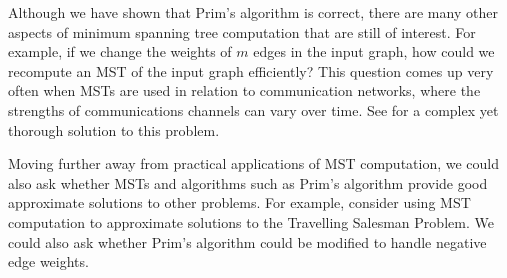 \documentclass[a4paper,11pt]{report}
\theoremstyle{plain}
\theoremstyle{definition}
\begin{document}
Although we have shown that Prim's algorithm is correct, there are many other
aspects of minimum spanning tree computation that are still of interest. For
example, if we change the weights of $m$ edges in the input graph, how could we
recompute an MST of the input graph efficiently? This question comes up very
often when MSTs are used in relation to communication networks, where the
strengths of communications channels can vary over time. See
\cite[§8]{eisner97} for a complex yet thorough solution to this problem.

Moving further away from practical applications of MST computation, we could
also ask whether MSTs and algorithms such as Prim's algorithm provide good
approximate solutions to other problems. For example, consider using MST
computation to approximate solutions to the Travelling Salesman Problem. We
could also ask whether Prim's algorithm could be modified to handle negative
edge weights.



\end{document}
